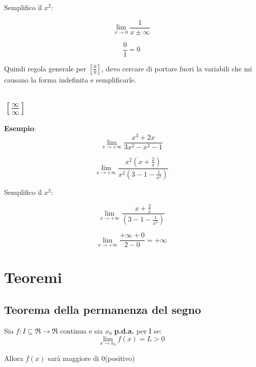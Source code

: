 \documentclass{article}
\begin{document}
Semplifico il $x^2$:

\begin{equation*}
    \lim_{x \rightarrow 0} \frac{1}{x \pm\infty}
\end{equation*}

\begin{equation*}
    \frac{0}{1} = 0
\end{equation*}


Quindi regola generale per $[\frac{0}{0}]$, devo cercare di portare fuori la variabili che mi causano la forma indefinita
e semplificarle.

\subsection{$[\frac{\infty}{\infty}]$}

\textbf{Esempio}:
\begin{equation*}
    \lim_{x \rightarrow + \infty} \frac{x^3 + 2x}{3x^2 - x^2 -1}
\end{equation*}

\begin{equation*}
    \lim_{x \rightarrow + \infty} \frac{x^2(x + \frac{2}{x})}
    {x^2(3 - 1 -\frac{1}{x^2})}
\end{equation*}

Semplifico il $x^2$:

\begin{equation*}
    \lim_{x \rightarrow + \infty} \frac{x + \frac{2}{x}}
    {(3 - 1 -\frac{1}{x^2})}
\end{equation*}

\begin{equation*}
    \lim_{x \rightarrow + \infty} \frac{+\infty + 0}
    {2 - 0} = +\infty
\end{equation*}

\section{Teoremi}
\subsection{Teorema della permanenza del segno}

Sia $f: I \subseteq \Re \rightarrow \Re$ continua e sia $x_0$ \textbf{p.d.a.} per I se:
\begin{equation*}
    \lim_{x \rightarrow x_0} f(x) = L > 0
\end{equation*}

Allora $f(x)$ sarà maggiore di 0(positivo)
\end{document}
